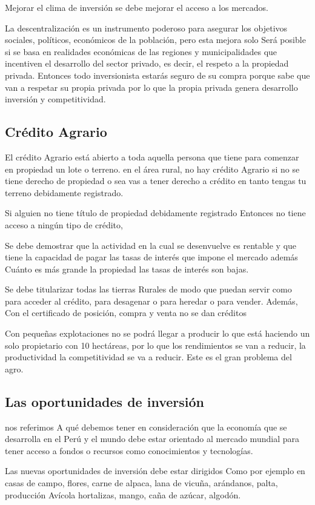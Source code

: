 \documentclass[
  a4paper,
]{article}
\begin{document}
Mejorar el clima de inversión se debe mejorar el acceso a los mercados.

La descentralización es un instrumento poderoso para asegurar los
objetivos sociales, políticos, económicos de la población, pero esta
mejora solo Será posible si se basa en realidades económicas de las
regiones y municipalidades que incentiven el desarrollo del sector
privado, es decir, el respeto a la propiedad privada. Entonces todo
inversionista estarás seguro de su compra porque sabe que van a respetar
su propia privada por lo que la propia privada genera desarrollo
inversión y competitividad.

\hypertarget{cruxe9dito-agrario}{%
\subsection{Crédito Agrario}\label{cruxe9dito-agrario}}

El crédito Agrario está abierto a toda aquella persona que tiene para
comenzar en propiedad un lote o terreno. en el área rural, no hay
crédito Agrario si no se tiene derecho de propiedad o sea vas a tener
derecho a crédito en tanto tengas tu terreno debidamente registrado.

Si alguien no tiene título de propiedad debidamente registrado Entonces
no tiene acceso a ningún tipo de crédito,

Se debe demostrar que la actividad en la cual se desenvuelve es rentable
y que tiene la capacidad de pagar las tasas de interés que impone el
mercado además Cuánto es más grande la propiedad las tasas de interés
son bajas.

Se debe titularizar todas las tierras Rurales de modo que puedan servir
como para acceder al crédito, para desagenar o para heredar o para
vender. Además, Con el certificado de posición, compra y venta no se dan
créditos

Con pequeñas explotaciones no se podrá llegar a producir lo que está
haciendo un solo propietario con 10 hectáreas, por lo que los
rendimientos se van a reducir, la productividad la competitividad se va
a reducir. Este es el gran problema del agro.

\hypertarget{las-oportunidades-de-inversiuxf3n}{%
\subsection{Las oportunidades de
inversión}\label{las-oportunidades-de-inversiuxf3n}}

nos referimos A qué debemos tener en consideración que la economía que
se desarrolla en el Perú y el mundo debe estar orientado al mercado
mundial para tener acceso a fondos o recursos como conocimientos y
tecnologías.

Las nuevas oportunidades de inversión debe estar dirigidos Como por
ejemplo en casas de campo, flores, carne de alpaca, lana de vicuña,
arándanos, palta, producción Avícola hortalizas, mango, caña de azúcar,
algodón.


\printbibliography
\end{document}

